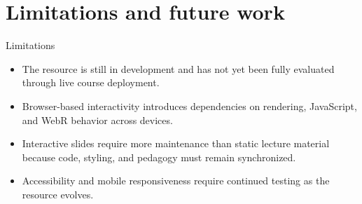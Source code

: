 \documentclass[aspectratio=169,10pt]{beamer}
\begin{document}
\section{Limitations and future work}

\begin{frame}{Limitations}
\vspace{0.7em}
\begin{itemize}
  \item The resource is still in development and has not yet been fully evaluated through live course deployment.
  \item Browser-based interactivity introduces dependencies on rendering, JavaScript, and WebR behavior across devices.
  \item Interactive slides require more maintenance than static lecture material because code, styling, and pedagogy must remain synchronized.
  \item Accessibility and mobile responsiveness require continued testing as the resource evolves.
\end{itemize}
\end{frame}
\end{document}
